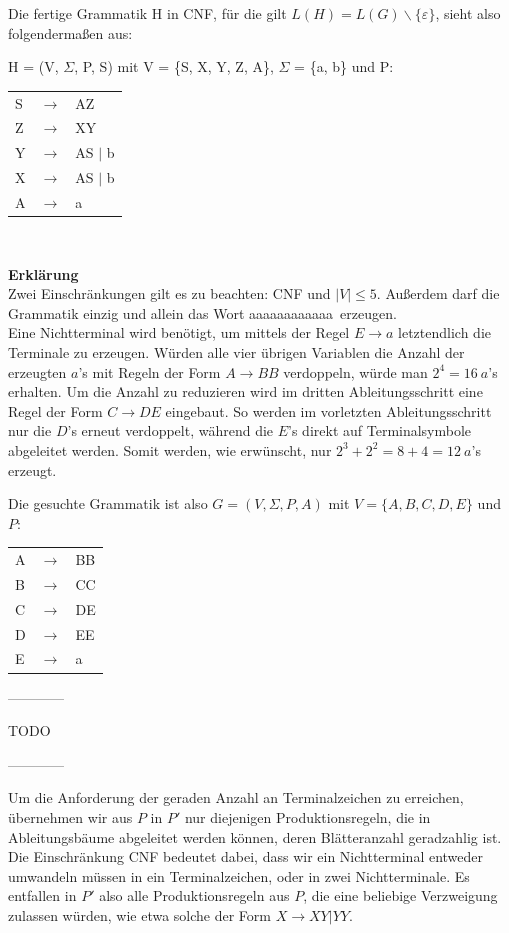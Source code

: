 \begin{teile}
	Die fertige Grammatik H in CNF, für die gilt $L(H)=L(G)\backslash \{\varepsilon \}$, sieht also folgendermaßen aus:
	
	H = (V, $\Sigma$, P, S) mit V = \{S, X, Y, Z, A\}, $\Sigma$ = \{a, b\} und P:
	
	\begin{tabular}{lcl}
		S  & $\rightarrow$ & AZ  \\
		Z  & $\rightarrow$ & XY \\
		Y  & $\rightarrow$ & AS $\mid$ b \\
		X  & $\rightarrow$ & AS $\mid$ b \\ 
		A  & $\rightarrow$ & a \\
	\end{tabular} \\

	\item 
	\textbf{Erklärung} \\
	Zwei Einschränkungen gilt es zu beachten: CNF und $|V| \leq 5$. Außerdem darf die Grammatik einzig und allein das Wort \glqq aaaaaaaaaaaa\grqq\ erzeugen. \\
	Eine Nichtterminal wird benötigt, um mittels der Regel $E\rightarrow a$ letztendlich die Terminale zu erzeugen.
	Würden alle vier übrigen Variablen die Anzahl der erzeugten $a$'s mit Regeln der Form $A\rightarrow BB$ verdoppeln, würde man $2^4=16\ a$'s erhalten. Um die Anzahl zu reduzieren wird im dritten Ableitungsschritt eine Regel der Form $C\rightarrow DE$ eingebaut. So werden im vorletzten Ableitungsschritt nur die $D$'s erneut verdoppelt, während die $E$'s direkt auf Terminalsymbole abgeleitet werden. Somit werden, wie erwünscht, nur $2^3 + 2^2 = 8 + 4 = 12\ a$'s erzeugt.

	Die gesuchte Grammatik ist also $G = (V, \Sigma, P, A)$ mit $V = \{A, B, C, D, E\}$ und $P$:
	
	\begin{tabular}{lcl}
		A & $\rightarrow$ & BB \\
		B & $\rightarrow$ & CC \\
		C & $\rightarrow$ & DE \\
		D & $\rightarrow$ & EE \\
		E & $\rightarrow$ & a  \\
	\end{tabular}
	
	\item 
	------------

	TODO
	
	------------
	
	Um die Anforderung der geraden Anzahl an Terminalzeichen zu erreichen, übernehmen wir aus $P$ in $P'$ nur diejenigen Produktionsregeln, die in Ableitungsbäume abgeleitet werden können, deren Blätteranzahl geradzahlig ist. \\
	Die Einschränkung CNF bedeutet dabei, dass wir ein Nichtterminal entweder umwandeln müssen in ein Terminalzeichen, oder in zwei Nichtterminale. Es entfallen in $P'$ also alle Produktionsregeln aus $P$, die eine beliebige Verzweigung zulassen würden, wie etwa solche der Form $X \rightarrow XY | YY$.
	
\end{teile}

